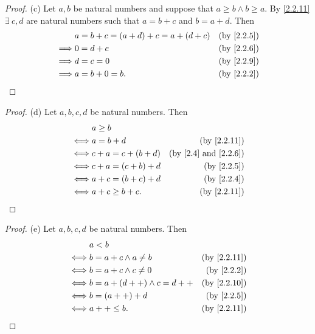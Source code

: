 \begin{proof}{(c)}
  Let \(a, b\) be natural numbers and suppose that \(a \geq b \land b \geq a\).
  By \cref{2.2.11} \(\exists\ c, d\) are natural numbers such that \(a = b + c\) and \(b = a + d\).
  Then
  \begin{align*}
             & a = b + c = (a + d) + c = a + (d + c) & \text{(by \cref{2.2.5})} \\
    \implies & 0 = d + c                             & \text{(by \cref{2.2.6})} \\
    \implies & d = c = 0                             & \text{(by \cref{2.2.9})} \\
    \implies & a = b + 0 = b.                        & \text{(by \cref{2.2.2})}
  \end{align*}
\end{proof}

\begin{proof}{(d)}
  Let \(a, b, c, d\) be natural numbers.
  Then
  \begin{align*}
         & a \geq b                                                      \\
    \iff & a = b + d           & \text{(by \cref{2.2.11})}               \\
    \iff & c + a = c + (b + d) & \text{(by \cref{2.4} and \cref{2.2.6})} \\
    \iff & c + a = (c + b) + d & \text{(by \cref{2.2.5})}                \\
    \iff & a + c = (b + c) + d & \text{(by \cref{2.2.4})}                \\
    \iff & a + c \geq b + c.   & \text{(by \cref{2.2.11})}
  \end{align*}
\end{proof}

\begin{proof}{(e)}
  Let \(a, b, c, d\) be natural numbers.
  Then
  \begin{align*}
         & a < b                                                   \\
    \iff & b = a + c \land a \neq b    & \text{(by \cref{2.2.11})} \\
    \iff & b = a + c \land c \neq 0    & \text{(by \cref{2.2.2})}  \\
    \iff & b = a + (d++) \land c = d++ & \text{(by \cref{2.2.10})} \\
    \iff & b = (a++) + d               & \text{(by \cref{2.2.5})}  \\
    \iff & a++ \leq b.                 & \text{(by \cref{2.2.11})}
  \end{align*}
\end{proof}

